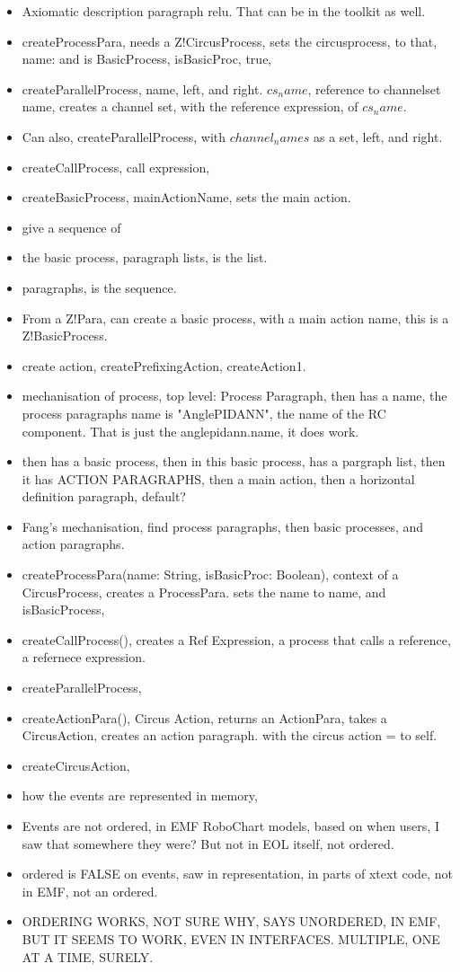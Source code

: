 \documentclass{article}
\begin{document}
\begin{itemize}
  \item Axiomatic description paragraph relu. That can be in the toolkit as well. 
  \item createProcessPara, needs a Z!CircusProcess, sets the circusprocess, to that, name: and is BasicProcess, isBasicProc, true, 
  \item createParallelProcess, name, left, and right. $cs_name$, reference to channelset name, creates a channel set, with the reference expression, of $cs_name$. 
  \item Can also, createParallelProcess, with $channel_names$ as a set, left, and right. 
  \item createCallProcess, call expression, 
  \item createBasicProcess, mainActionName, sets the main action. 
  \item give a sequence of 
  \item the basic process, paragraph lists, is the list. 
  \item paragraphs, is the sequence. 
  \item From a Z!Para, can create a basic process, with a main action name, this is a Z!BasicProcess. 
  \item create action, createPrefixingAction, createAction1. 
  \item mechanisation of process, top level: Process Paragraph, then has a name, the process paragraphs name is "AnglePIDANN", the name of the RC component. That is just the anglepidann.name, it does work. 
  \item then has a basic process, then in this basic process, has a pargraph list, then it has ACTION PARAGRAPHS, then a main action, then a horizontal definition paragraph, default? 
  \item Fang's mechanisation, find process paragraphs, then basic processes, and action paragraphs. 
  \item createProcessPara(name: String, isBasicProc: Boolean), context of a CircusProcess, creates a ProcessPara. sets the name to name, and isBasicProcess, 
  \item createCallProcess(), creates a Ref Expression, a process that calls a reference, a refernece expression. 
  \item createParallelProcess, 
  \item createActionPara(), Circus Action, returns an ActionPara, takes a CircusAction, creates an action paragraph. with the circus action = to self. 
  \item createCircusAction, 
  \item how the events are represented in memory, 
  \item Events are not ordered, in EMF RoboChart models, based on when users, I saw that somewhere they were? But not in EOL itself, not ordered. 
  \item ordered is FALSE on events, saw in representation, in parts of xtext code, not in EMF, not an ordered. 
  \item ORDERING WORKS, NOT SURE WHY, SAYS UNORDERED, IN EMF, BUT IT SEEMS TO WORK, EVEN IN INTERFACES. MULTIPLE, ONE AT A TIME, SURELY. 
\end{itemize} 
\end{document}
